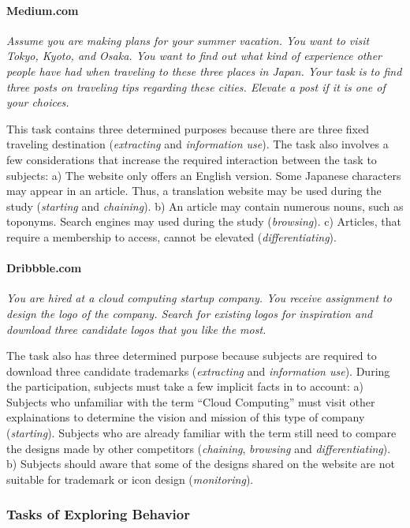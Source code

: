 \paragraph{Medium.com} \emph{Assume you are making plans for your summer vacation. 
        You want to visit Tokyo, Kyoto, and Osaka. You want to find out what kind of experience other people have had 
        when traveling to these three places in Japan. Your task is to find three posts on 
        traveling tips regarding these cities. Elevate a post if it is one of your choices.}

This task contains three determined purposes because there are three fixed traveling 
destination (\emph{extracting} and \emph{information use}).
The task also involves a few considerations that increase the required interaction between 
the task to subjects:
a) The website only offers an English version. Some Japanese characters may appear in an article.
Thus, a translation website may be used during the study (\emph{starting} and \emph{chaining}).
b) An article may contain numerous nouns, such as toponyms. Search engines may used during the study (\emph{browsing}).
c) Articles, that require a membership to access, cannot be elevated (\emph{differentiating}). 

\paragraph{Dribbble.com} \emph{You are hired at a cloud computing startup company. You receive assignment to 
        design the logo of the company. Search for existing logos for inspiration and 
        download three candidate logos that you like the most.}

The task also has three determined purpose because subjects are required to download 
three candidate trademarks (\emph{extracting} and \emph{information use}).
During the participation, subjects must take a few implicit facts in to account:
a) Subjects who unfamiliar with the term ``Cloud Computing'' must visit other explainations 
to determine the vision and mission of this type of company (\emph{starting}). 
Subjects who are already familiar with the term still need to compare the designs 
made by other competitors (\emph{chaining}, \emph{browsing} and \emph{differentiating}).
b) Subjects should aware that some of the designs shared on the website are not suitable 
for trademark or icon design (\emph{monitoring}).

\subsubsection{Tasks of Exploring Behavior}

